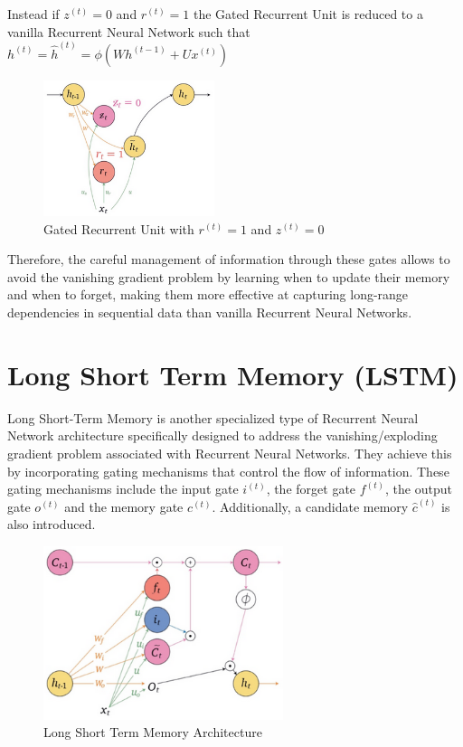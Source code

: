 \newpage
\noindent Instead if $z^{(t)} = 0$ and $r^{(t)} = 1$ the Gated Recurrent Unit is reduced to a vanilla Recurrent Neural Network such that $h^{(t)} = \hat{h}^{(t)} = \phi \left( W h^{(t-1)} + U x^{(t)} \right)$

\begin{figure}[h]
    \centering
    \includegraphics[width=5cm]{Images/GRUr1z0.png}
    \caption{Gated Recurrent Unit with $r^{(t)} = 1$ and $z^{(t)} = 0$}
    \label{fig:gru-r1-z0}
\end{figure}

\noindent Therefore, the careful management of information through these gates allows to avoid the vanishing gradient problem by learning when to update their memory and when to forget, making them more effective at capturing long-range dependencies in sequential data than vanilla Recurrent Neural Networks. 


\section{Long Short Term Memory (LSTM)}

Long Short-Term Memory is another specialized type of Recurrent Neural Network architecture specifically designed to address the vanishing/exploding gradient problem associated with Recurrent Neural Networks. They achieve this by incorporating gating mechanisms that control the flow of information. These gating mechanisms include the input gate $i^{(t)}$, the forget gate $f^{(t)}$, the output gate $o^{(t)}$ and the memory gate $c^{(t)}$. Additionally, a candidate memory $\hat{c}^{(t)}$ is also introduced.

\begin{figure}[h]
    \centering
    \includegraphics[width=7cm]{Images/lstm-architecture.png}
    \caption{Long Short Term Memory Architecture}
    \label{fig:lstm-architecture}
\end{figure}


